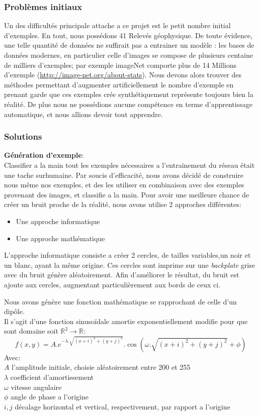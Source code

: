 \documentclass[a4paper, 12pt, titlepage, oneside, french]{article}
\begin{document}
	\newpage
	\subsubsection{Problèmes initiaux}
	Un des difficultés principale attache a ce projet est le petit nombre initial d'exemples. En tout, nous possédons 41 Relevés géophysique. De toute évidence, une telle quantité de données ne suffirait pas a entrainer un modèle : les bases de données modernes, en particulier celle d'images se compose de plusieurs centaine de milliers d'exemples; par exemple imageNet comporte plus de 14 Millions d'exemple (\url{http://image-net.org/about-stats}). Nous devons alors trouver des méthodes permettant d'augmenter artificiellement le nombre d'exemple en prenant garde que ces exemples crée synthétiquement représente toujours bien la réalité. De plus nous ne possédions aucune compétence en terme d'apprentissage automatique, et nous allions devoir tout apprendre. 
	\subsubsection{Solutions}
	\textbf{Génération d'exemple}:\\
	Classifier a la main tout les exemples nécessaires a l'entrainement du réseau était une tache surhumaine. Par soucis d'efficacité, nous avons décidé de construire nous même
	nos exemples, et des les utiliser en combinaison avec des exemples provenant des images, et classifie a la main.
	Pour avoir une meilleure chance de créer un bruit proche de la réalité, nous avons utilise 2 approches différentes:
	\begin{itemize}
		\item Une approche informatique
		\item Une approche mathématique
	\end{itemize}
	L'approche informatique consiste a créer 2 cercles, de tailles variables,un noir et un blanc, ayant la même origine. Ces cercles sont imprime sur une \textit{backplate} grise avec du bruit génère aléatoirement. Afin d'améliorer le résultat, du bruit est ajoute aux cercles, augmentant particulièrement aux bords de ceux ci.

	Nous avons génère une fonction mathématique se rapprochant de celle d'un dipôle.\\
	Il s'agit d'une fonction sinusoïdale amortie exponentiellement modifie pour que sont domaine soit $\mathbb{R}^2 \to \mathbb{R}$:
	\[f(x,y) = A.e^{-\lambda . \sqrt{(x+i)^2+(y+j)^2}}.\cos(\omega . \sqrt{(x+i)^2+(y+j)^2} + \phi)\]
	Avec:\\
	\indent $A$ l'amplitude initiale, choisie aléatoirement entre 200 et 255\\
	\indent$\lambda$ coefficient d'amortissement\\
	\indent$\omega$ vitesse angulaire\\
	\indent$\phi$ angle de phase a l'origine\\
	\indent$i,j$ décalage horizontal et vertical, respectivement, par rapport a l'origine
\end{document}
